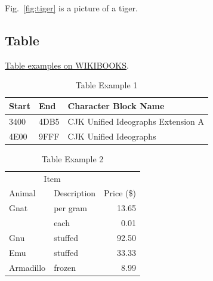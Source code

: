 Fig.~\ref{fig:tiger} is a picture of a tiger.


\subsection{Table}
\label{ss:Table}

\href{http://en.wikibooks.org/wiki/LaTeX/Tables}{Table examples on WIKIBOOKS}.

\begin{table}[htpb]\begin{center}
\caption{Table Example 1}
\begin{tabularx}{8cm}{llX}
\hline
Start & End  & Character Block Name \\
\hline
3400  & 4DB5 & CJK Unified Ideographs Extension A \\
4E00  & 9FFF & CJK Unified Ideographs \\
\hline
\end{tabularx}
 \end{center}\end{table}

\begin{table}[htpb]\begin{center}
\caption{Table Example 2}
\begin{tabular}{llr}
\hline
\multicolumn{2}{c}{Item} \\
\cline{1-2}
Animal & Description & Price (\$) \\
\hline
Gnat  & per gram & 13.65 \\
      & each     &  0.01 \\
Gnu   & stuffed  & 92.50 \\
Emu   & stuffed  & 33.33 \\
Armadillo & frozen & 8.99 \\
\hline
\end{tabular}
 \end{center}\end{table}
 
